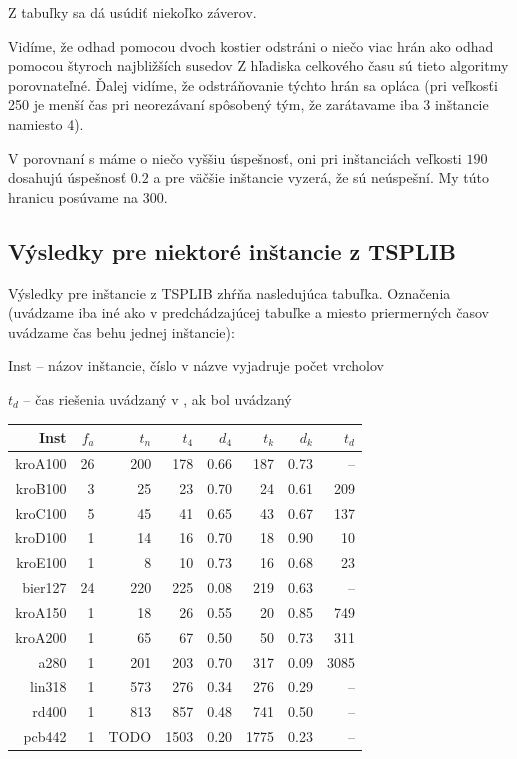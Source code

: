 Z tabuľky sa dá usúdiť niekoľko záverov.

Vidíme, že odhad pomocou dvoch kostier odstráni o niečo viac hrán ako odhad pomocou štyroch najbližších susedov
Z hľadiska celkového času sú tieto algoritmy
porovnateľné. Ďalej vidíme, že odstráňovanie týchto hrán sa opláca (pri veľkosťi 250 je menší
čas pri neorezávaní spôsobený tým, že zarátavame iba 3 inštancie namiesto 4).

V porovnaní s \cite{duchenne} máme o niečo vyššiu úspešnosť, oni pri inštanciách
veľkosti $190$ dosahujú úspešnosť $0.2$ a pre väčšie inštancie vyzerá, že sú neúspešní.
My túto hranicu posúvame na $300$.

\subsection{Výsledky pre niektoré inštancie z TSPLIB}

Výsledky pre inštancie z TSPLIB zhŕňa nasledujúca tabuľka. 
Označenia (uvádzame iba iné ako v predchádzajúcej tabuľke a miesto priermerných časov uvádzame čas
behu jednej inštancie):
\begin{myitemize}
\item Inst -- názov inštancie, číslo v názve vyjadruje počet vrcholov
\item $t_d$ -- čas riešenia uvádzaný v \cite{duchenne}, ak bol uvádzaný
\end{myitemize}

\begin{table}[h]
\centering
\begin{tabular}{|r|r|r|r|r|r|r|r|}
\hline
Inst    &$f_a$&$t_n$&$t_4$&$d_4$&$t_k$&$d_k$&$t_d$ \\\hline
kroA100 & 26  & 200 & 178& 0.66 & 187 & 0.73& -- \\\hline
kroB100 & 3   & 25  & 23 & 0.70 & 24  & 0.61& 209 \\\hline 
kroC100 & 5   & 45  & 41 & 0.65 & 43  & 0.67& 137 \\\hline
kroD100 & 1   & 14  & 16 & 0.70 & 18  & 0.90& 10 \\\hline
kroE100 & 1   & 8   & 10 & 0.73 & 16  & 0.68& 23 \\\hline
bier127 & 24  & 220 & 225& 0.08 & 219 & 0.63& -- \\\hline 
kroA150 & 1   & 18  & 26 & 0.55 & 20  & 0.85& 749 \\\hline
kroA200 & 1   & 65  & 67 & 0.50 & 50  & 0.73& 311 \\\hline
a280    & 1   & 201 & 203& 0.70 & 317 & 0.09& 3085 \\\hline
lin318  & 1   & 573 & 276& 0.34 & 276 & 0.29& -- \\\hline
rd400   & 1   & 813 & 857& 0.48 & 741 & 0.50& -- \\\hline
pcb442  & 1   & TODO&1503& 0.20 & 1775& 0.23& -- \\\hline
\end{tabular}
\end{table}


